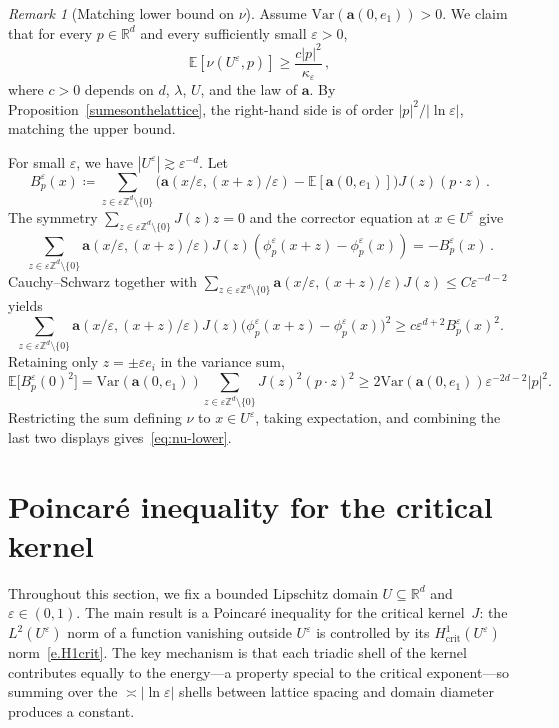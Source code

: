 \documentclass[11pt]{amsart}
\theoremstyle{plain}
\theoremstyle{definition}
\theoremstyle{remark}
\newtheorem{remark}[theorem]{Remark}
\newcommand{\E}{\mathbb{E}}
\newcommand{\Rd}{\mathbb{R}^d}
\newcommand{\R}{\mathbb{R}}
\newcommand{\Z}{\mathbb{Z}}
\renewcommand{\a}{\mathbf{a}}
\newcommand{\eps}{\varepsilon}
\newcommand{\Var}{\text{Var}}
\begin{document}
	\begin{remark}[Matching lower bound on $\nu$]\label{rem:nu-lower-bound}
		Assume $\Var(\a(0,e_1)) > 0$. We claim that for every $p \in \R^d$ and every
		sufficiently small $\eps > 0$,
		\begin{equation}\label{eq:nu-lower}
			\E[\nu(U^\eps,p)] \ge \frac{c |p|^2}{\kappa_\eps}\,,
		\end{equation}
		where $c > 0$ depends on $d$, $\lambda$, $U$, and the law of $\a$. By
		Proposition~\ref{sumesonthelattice}, the right-hand side is of order
		$|p|^2/|\ln \eps|$, matching the upper bound. 
		
		For small
		$\eps$, we have $|U^\eps|
		\gtrsim \eps^{-d}$.
		Let
		\[
		B_p^\eps(x) \coloneqq \sum_{z\in\eps\Z^d\setminus\{0\}}\bigl(
		\a(x/\eps,(x+z)/\eps)- \E[\a(0,e_1)]\bigr) J(z) (p\cdot z)\,.
		\]
		The symmetry $\sum_{z \in \eps\Z^d \setminus \{0\}} J(z)z = 0$ and the corrector equation at $x \in
		U^\eps$ give
		\[
		\sum_{z\in\eps\Z^d\setminus\{0\}}  \a(x/\eps,(x+z)/\eps) J(z) (\phi_p^\eps(
		x+z)-\phi_p^\eps(x))
		= -B_p^\eps(x)\,.
		\]
		Cauchy--Schwarz together with
		$\sum_{z \in \eps\Z^d \setminus \{0\}}  \a(x/\eps,(x+z)/\eps) J(z) \le
		C\eps^{-d-2}$ yields
		\[
		\sum_{z\in\eps\Z^d\setminus\{0\}}  \a(x/\eps,(x+z)/\eps) J(z)
		\bigl(\phi_p^\eps(x+z)-\phi_p^\eps(x)\bigr)^2
		\ge c \eps^{d+2} B_p^\eps(x)^2.
		\]
		Retaining only $z = \pm\eps e_i$ in the variance sum,
		\[
		\E\bigl[B_p^\eps(0)^2\bigr]
		= \Var( \a(0,e_1))\sum_{z\in\eps\Z^d\setminus\{0\}}J(z)^2(p\cdot z)^2
		\ge 2\Var( \a(0,e_1)) \eps^{-2d-2}|p|^2.
		\]
		Restricting the sum defining $\nu$ to $x \in U^\eps$, taking
		expectation, and
		combining the last two displays gives~\eqref{eq:nu-lower}.
	\end{remark}
	
	\section{Poincar\'e inequality for the critical kernel} \label{sec:poincare}
	
	Throughout this section, we fix a bounded Lipschitz domain $U \subseteq \Rd$ and $\eps \in (0,1)$.
	The main result is a Poincar\'e inequality for the critical kernel~$J$: the $L^2(U^\eps)$ norm of a function vanishing outside $U^\eps$ is controlled by its $H^1_{\mathrm{crit}}(U^\eps)$ norm~\eqref{e.H1crit}.
	The key mechanism is that each triadic shell of the kernel contributes equally to the energy---a property special to the critical exponent---so summing over the $\asymp \left| \ln \eps \right|$ shells between lattice spacing and domain diameter produces a constant.
	
\end{document}
